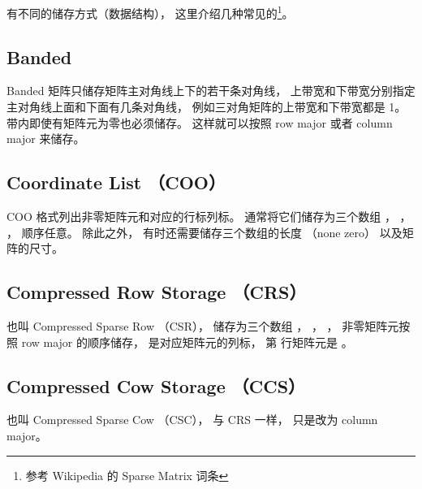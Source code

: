 
有不同的储存方式（数据结构）， 这里介绍几种常见的\footnote{参考 Wikipedia 的 Sparse Matrix 词条}。

\subsection{Banded}
Banded 矩阵只储存矩阵主对角线上下的若干条对角线， 上带宽和下带宽分别指定主对角线上面和下面有几条对角线， 例如三对角矩阵的上带宽和下带宽都是 1。 带内即使有矩阵元为零也必须储存。 这样就可以按照 row major 或者 column major 来储存。

\subsection{Coordinate List （COO）}
COO 格式列出非零矩阵元和对应的行标列标。 通常将它们储存为三个数组 ， ， ， 顺序任意。 除此之外， 有时还需要储存三个数组的长度  （none zero） 以及矩阵的尺寸。

\subsection{Compressed Row Storage （CRS）}
也叫 Compressed Sparse Row （CSR）， 储存为三个数组 ， ， ， 非零矩阵元按照 row major 的顺序储存，  是对应矩阵元的列标， 第  行矩阵元是 。

\subsection{Compressed Cow Storage （CCS）}
也叫 Compressed Sparse Cow （CSC）， 与 CRS 一样， 只是改为 column major。
